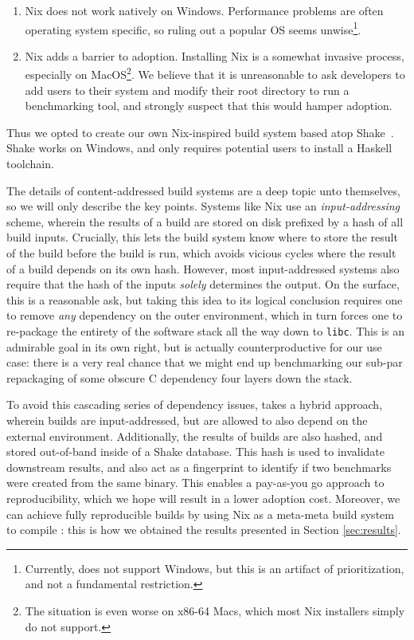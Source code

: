 \documentclass[a4paper,UKenglish,cleveref, autoref, thm-restate,anonymous]{lipics-v2021}
\begin{document}
\begin{enumerate}
\item Nix does not work natively on Windows. Performance problems
  are often operating system specific, so ruling out a popular OS
  seems unwise\footnote{Currently, \panbench does not support Windows, but this
  is an artifact of prioritization, and not a fundamental restriction.}.
\item Nix adds a barrier to adoption. Installing Nix is a somewhat
  invasive process, especially on MacOS\footnote{The situation is even worse on x86-64 Macs, which most Nix installers
  simply do not support.}.
We believe that it is unreasonable to ask developers to add users to their system and modify
their root directory to run a benchmarking tool, and strongly suspect that this would
hamper adoption.
\end{enumerate}

Thus we opted to create our own Nix-inspired build system based atop
Shake~\cite{Mitchell:2012}.  Shake works on Windows, and only requires
potential users to install a Haskell toolchain.

The details of content-addressed build systems are a deep topic unto themselves,
so we will only describe the key points. Systems like Nix use an
\emph{input-addressing} scheme, wherein the results of a build are
stored on disk prefixed by a hash of all build inputs. Crucially, this lets the build
system know where to store the result of the build before the build is run, which
avoids vicious cycles where the result of a build depends on its own hash. However,
most input-addressed systems also require that the hash of the inputs \emph{solely}
determines the output. On the surface, this is a reasonable ask, but taking this
idea to its logical conclusion requires one to remove \emph{any} dependency
on the outer environment, which in turn forces one to re-package the entirety of the software
stack all the way down to \texttt{libc}. This is an admirable goal in its own right,
but is actually counterproductive for our use case: there is a very real chance
that we might end up benchmarking our sub-par repackaging of some obscure C dependency
four layers down the stack.

To avoid this cascading series of dependency issues, \panbench takes a hybrid approach,
wherein builds are input-addressed, but are allowed to also depend on the external
environment. Additionally, the results of builds are also hashed, and stored out-of-band
inside of a Shake database. This hash is used to invalidate downstream
results, and also act as a fingerprint to identify if two benchmarks were created from the
same binary. This enables a pay-as-you go approach to reproducibility, which we hope
will result in a lower adoption cost. Moreover, we can achieve fully reproducible builds
by using Nix as a meta-meta build system to compile \panbench: this is how we obtained
the results presented in Section \ref{sec:results}.
\end{document}
